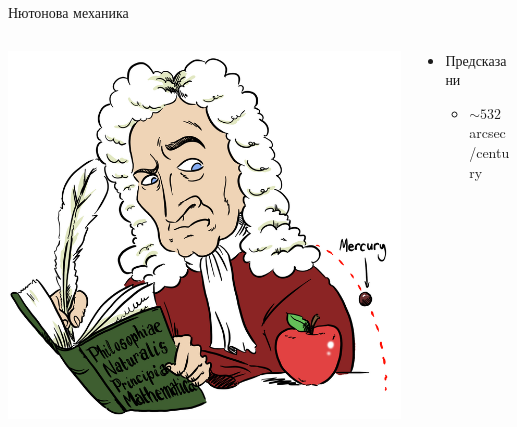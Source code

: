 \documentclass[10pt,a4paper]{beamer}
\begin{document}
        \begin{frame}{ Нютонова механика }
            \begin{columns}
                \begin{column}{0.5\textwidth}
                    \includegraphics[width=\textwidth]{images/newton_mercury_perih.png}
                \end{column}
                \begin{column}{0.5\textwidth}
                    \begin{itemize}
                        \item Предсказани \begin{itemize}
                            \item $ \sim 532 $ arcsec/century
                        \end{itemize}
                    \end{itemize}
                \end{column}
            \end{columns}
        \end{frame}
    
\end{document}
